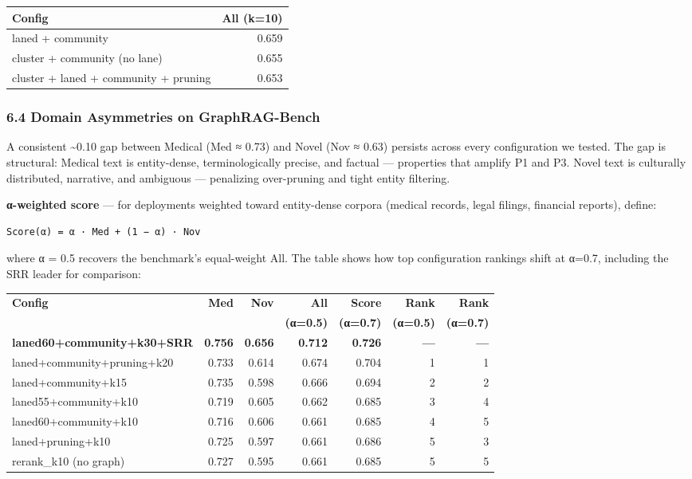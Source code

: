 \begin{small}
\setlength{\tabcolsep}{4pt}
\begin{longtable}{p{3.0in}r}
\toprule
\textbf{Config} & \textbf{All (k=10)} \\
\midrule
\endhead
laned + community & 0.659 \\
cluster + community (no lane) & 0.655 \\
cluster + laned + community + pruning & 0.653 \\
\bottomrule
\end{longtable}
\end{small}

\subsubsection{6.4 Domain Asymmetries on GraphRAG-Bench}\label{domain-asymmetries-on-graphrag-bench}

A consistent \textasciitilde0.10 gap between Medical (Med ≈ 0.73) and Novel (Nov ≈ 0.63) persists across every configuration we tested. The gap is structural: Medical text is entity-dense, terminologically precise, and factual --- properties that amplify P1 and P3. Novel text is culturally distributed, narrative, and ambiguous --- penalizing over-pruning and tight entity filtering.

\textbf{α-weighted score} --- for deployments weighted toward entity-dense corpora (medical records, legal filings, financial reports), define:

\begin{verbatim}
Score(α) = α · Med + (1 − α) · Nov
\end{verbatim}

where α = 0.5 recovers the benchmark's equal-weight All. The table shows how top configuration rankings shift at α=0.7, including the SRR leader for comparison:

\begin{small}
\setlength{\tabcolsep}{5pt}
\begin{longtable}{lrrrrrr}
\toprule
\textbf{Config} & \textbf{Med} & \textbf{Nov} & \textbf{All} & \textbf{Score} & \textbf{Rank} & \textbf{Rank} \\
 & & & \textbf{(α=0.5)} & \textbf{(α=0.7)} & \textbf{(α=0.5)} & \textbf{(α=0.7)} \\
\midrule
\endhead
\textbf{laned60+community+k30+SRR} & \textbf{0.756} & \textbf{0.656} & \textbf{0.712} & \textbf{0.726} & \textbf{—} & \textbf{—} \\
laned+community+pruning+k20 & 0.733 & 0.614 & 0.674 & 0.704 & 1 & 1 \\
laned+community+k15 & 0.735 & 0.598 & 0.666 & 0.694 & 2 & 2 \\
laned55+community+k10 & 0.719 & 0.605 & 0.662 & 0.685 & 3 & 4 \\
laned60+community+k10 & 0.716 & 0.606 & 0.661 & 0.685 & 4 & 5 \\
laned+pruning+k10 & 0.725 & 0.597 & 0.661 & 0.686 & 5 & 3 \\
rerank\_k10 (no graph) & 0.727 & 0.595 & 0.661 & 0.685 & 5 & 5 \\
\bottomrule
\end{longtable}
\end{small}

